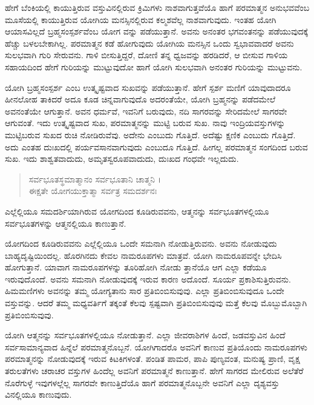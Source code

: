 ಹೇಗೆ ಬೆಂಕಿಯಲ್ಲಿ ಕಾಯುತ್ತಿರುವ ವಸ್ತುವಿನಲ್ಲಿರುವ ಕ್ರಿಮಿಗಳು ನಾಶವಾಗುತ್ತವೆಯೊ ಹಾಗೆ ಪರಮಾತ್ಮನ ಅನುಭವವೆಂಬ ಮೂಸೆಯಲ್ಲಿ ಕಾಯುತ್ತಿರುವ ಯೋಗಿಯ ಮನಸ್ಸಿನಲ್ಲಿರುವ ಕಲ್ಮಶವೆಲ್ಲ ನಾಶವಾಗುವುದು. ಇಂತಹ ಯೋಗಿ ಆಯಾಸವಿಲ್ಲದೆ ಬ್ರಹ್ಮಸಂಸ್ಪರ್ಶವೆಂಬ ಯೋಗ ವನ್ನು ಪಡೆಯುತ್ತಾನೆ. ಅವನು ಅನಂತರ ಭಗವಂತನನ್ನು ಪಡೆಯುವುದಕ್ಕೆ ಹೆಚ್ಚು ಬಳಲಬೇಕಾಗಿಲ್ಲ. ಪರಮಾತ್ಮನ ಕಡೆ ಹೋಗುವುದು ಯೋಗಿಯ ಮನಸ್ಸಿನ ಒಂದು ಸ್ವಭಾವವಾದರೆ ಅವನು ಸುಲಭವಾಗಿ ಗುರಿ ಸೇರುವನು. ಗಾಳಿ ಬೀಸುತ್ತಿದ್ದರೆ, ದೋಣಿ ತನ್ನ ಧ್ವಜವನ್ನು ಹರಡಿದರೆ, ಆ ಬೀಸುವ ಗಾಳಿಯ ಸಹಾಯದಿಂದ ಹೇಗೆ ಗುರಿಯನ್ನು ಮುಟ್ಟುವುದೋ ಹಾಗೆ ಯೋಗಿ ಸುಲಭವಾಗಿ ಅನಂತರ ಗುರಿಯನ್ನು ಮುಟ್ಟುವನು.

ಯೋಗಿ ಬ್ರಹ್ಮಸಂಸ್ಪರ್ಶ ಎಂಬ ಉತ್ಕೃಷ್ಟವಾದ ಸುಖವನ್ನು ಪಡೆಯುತ್ತಾನೆ. ಹೇಗೆ ಸ್ಪರ್ಶ ಮಣಿಗೆ ಯಾವುದಾದರೂ ಹೀನಲೋಹ ತಾಕಿದರೆ ಅದೂ ಕೂಡ ಚಿನ್ನವಾಗುವುದೊ ಅದರಂತೆಯೇ, ಯೋಗಿ ಬ್ರಹ್ಮನನ್ನು ಪಡೆದಮೇಲೆ ಅವನಂತೆಯೇ ಆಗುತ್ತಾನೆ. ಅವನ ಧರ್ಮವೆ, ಇವನಿಗೆ ಬರುವುದು, ನದಿ ಸಾಗರವನ್ನು ಸೇರಿದಮೇಲೆ ಸಾಗರವೇ ಆಗುವಂತೆ. ಇದು ಉತ್ಕೃಷ್ಟವಾದ ಸುಖ, ಪರಮಾತ್ಮನನ್ನು ಮುಟ್ಟಿ ಬರುವ ಸುಖ. ನಾವು ಇಂದ್ರಿಯವಸ್ತುಗಳನ್ನು ಮುಟ್ಟಿಬರುವ ಸುಖದ ರುಚಿ ನೋಡಿರುವೆವು. ಅದೇನು ಎಂಬುದು ಗೊತ್ತಿದೆ. ಅದೆಷ್ಟು ಕ್ಷಣಿಕ ಎಂಬುದು ಗೊತ್ತಿದೆ. ಅದು ಎಂತಹ ದುಃಖದಲ್ಲಿ ಪರ್ಯವಸಾನವಾಗುವುದು ಎಂಬುದೂ ಗೊತ್ತಿದೆ. ಹೀಗಲ್ಲ ಪರಮಾತ್ಮನ ಸಂಗದಿಂದ ಬರುವ ಸುಖ. ಇದು ಶಾಶ್ವತವಾದುದು, ಅಮೃತಸ್ವರೂಪವಾದುದು, ದುಃಖದ ಗಂಧವೇ ಇಲ್ಲದುದು.

\begin{verse}
ಸರ್ವಭೂತಸ್ಥಮಾತ್ಮಾನಂ ಸರ್ವಭೂತಾನಿ ಚಾತ್ಮನಿ ।\\ಈಕ್ಷತೇ ಯೋಗಯುಕ್ತಾತ್ಮಾ ಸರ್ವತ್ರ ಸಮದರ್ಶನಃ 
\end{verse}

{\small ಎಲ್ಲೆಲ್ಲಿಯೂ ಸಮದರ್ಶಿಯಾಗಿರುವ ಯೋಗದಿಂದ ಕೂಡಿರುವವನು, ಆತ್ಮನನ್ನು ಸರ್ವಭೂತಗಳಲ್ಲಿಯೂ ಸರ್ವಭೂತಗಳನ್ನು ಆತ್ಮನಲ್ಲಿಯೂ ಕಾಣುತ್ತಾನೆ.}

ಯೋಗದಿಂದ ಕೂಡಿರುವವನು ಎಲ್ಲೆಲ್ಲಿಯೂ ಒಂದೇ ಸಮನಾಗಿ ನೋಡುತ್ತಿರುವನು. ಅವನು ನೋಡುವುದು ಬಾಹ್ಯದೃಷ್ಟಿಯಿಂದಲ್ಲ. ಹೊರಗಿನದು ಕೇವಲ ನಾಮರೂಪಗಳು ಮಾತ್ರವೆ. ಯೋಗಿ ನಾಮರೂಪವನ್ನೇ ಭೇದಿಸಿ ಹೋಗುತ್ತಾನೆ. ಯಾವಾಗ ನಾಮರೂಪಗಳನ್ನು ತೂರಿಹೋಗಿ ನೋಡು ತ್ತಾನೆಯೊ ಆಗ ಎಲ್ಲಾ ಕಡೆಯೂ ಇರುವುದೊಂದೆ. ಅವನು ಸಮನಾಗಿ ನೋಡುವುದಕ್ಕೆ ಇರುವ ಕಾರಣ ಅದೊಂದೆ. ಸೂರ್ಯ ಪ್ರಕಾಶಿಸುತ್ತಿರುವನು. ಹಿಮಮಣಿಗಳು ಅವನನ್ನು ತಮ್ಮ ಯೋಗ್ಯತಾನು ಸಾರ ಪ್ರತಿಬಿಂಬಿಸುವುವು. ಎಲ್ಲಾ ಪ್ರತಿಬಿಂಬಿಸುವುದೂ ಒಂದೇ ವಸ್ತುವನ್ನು. ಆದರೆ ತಮ್ಮ ಮಧ್ಯವರ್ತಿಗೆ ತಕ್ಕಂತೆ ಕೆಲವು ಸ್ಪಷ್ಟವಾಗಿ ಪ್ರತಿಬಿಂಬಿಸುವುವು ಮತ್ತೆ ಕೆಲವು ಮೊಬ್ಬುಮೊಬ್ಬಾಗಿ ಪ್ರತಿಬಿಂಬಿಸುವುವು.

ಯೋಗಿ ಆತ್ಮನನ್ನು ಸರ್ವಭೂತಗಳಲ್ಲಿಯೂ ನೋಡುತ್ತಾನೆ. ಎಲ್ಲಾ ಜೀವರಾಶಿಗಳ ಹಿಂದೆ, ಜಡವಸ್ತುವಿನ ಹಿಂದೆ ಸರ್ವಸಾಮಾನ್ಯವಾದ ಹಿನ್ನೆಲೆ ಪರಮಾತ್ಮನೊಬ್ಬನೆ. ಯೋಗಿಗಾದರೊ ಅವನಿಗೆ ಕಾಣುವ ಪ್ರತಿಯೊಂದು ನಾಮರೂಪಗಳು ಪರಮಾತ್ಮನನ್ನು ನೋಡುವುದಕ್ಕೆ ಇರುವ ಕಿಟಕಿಗಳಂತೆ. ಪಂಡಿತ ಪಾಮರ, ಪಾಪಿ ಪುಣ್ಯವಂತ, ಮನುಷ್ಯ ಪ್ರಾಣಿ, ವೃಕ್ಷ ತರುಲತೆಗಳು ಚರಾಚರ ವಸ್ತುಗಳ ಹಿಂದೆಲ್ಲ ಅವನಿಗೆ ಪರಮಾತ್ಮನೆ ಕಾಣುತ್ತಾನೆ. ಹೇಗೆ ಸಾಗರದ ಮೇಲಿರುವ ಅಲೆತೆರೆ ನೊರೆಗುಳ್ಳೆ ಇವುಗಳಲ್ಲೆಲ್ಲ ಸಾಗರವೇ ಕಾಣುತ್ತಿದೆಯೊ ಹಾಗೆ ಪರಮಾತ್ಮನೊಬ್ಬನೇ ಅವನಿಗೆ ಎಲ್ಲಾ ದೃಶ್ಯವಸ್ತು ವಿನಲ್ಲಿಯೂ ಕಾಣುವುದು.

